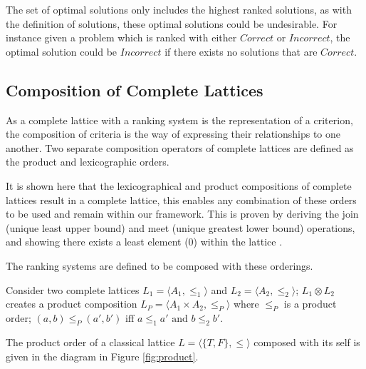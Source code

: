 The set of optimal solutions only includes the highest ranked solutions,
as with the definition of solutions, these optimal solutions could be undesirable.
For instance given a problem which is ranked with either $Correct$ or $Incorrect$, 
the optimal solution could be $Incorrect$ if there exists no solutions that are $Correct$. 

\subsection{Composition of Complete Lattices}
\label{sec:composition}
As a complete lattice with a ranking system is the representation of a criterion,
the composition of criteria is the way of expressing their relationships to one another. 
Two separate composition operators of complete lattices are defined as the product and lexicographic orders.

It is shown here that the lexicographical and product compositions of complete lattices result in a complete lattice,
this enables any combination of these orders to be used and remain within our framework.
This is proven by deriving the join (unique least upper bound) and meet (unique greatest lower bound) operations,
and showing there exists a least element ($0$) within the lattice \cite{davey1990introduction}. 

The ranking systems are defined to be composed with these orderings.

\begin{defs}
\label{def:product_order}
Consider two complete lattices $L_1 = \langle A_1, \leq_1 \rangle$ and $L_2 = \langle A_2, \leq_2 \rangle$;
$L_1 \otimes L_2$ creates a product composition $L_P = \langle A_1 \times A_2, \leq_P \rangle$
where $\leq_P$ is a product order; 
$(a,b) \leq_{P} (a',b') \mbox{ iff } a \leq_{1} a' \mbox{ and } b \leq_{2} b'$.
\end{defs}

The product order of a classical lattice $L = \langle \{T,F\}, \leq \rangle$ 
composed with its self is given in the diagram in Figure \ref{fig:product}.

